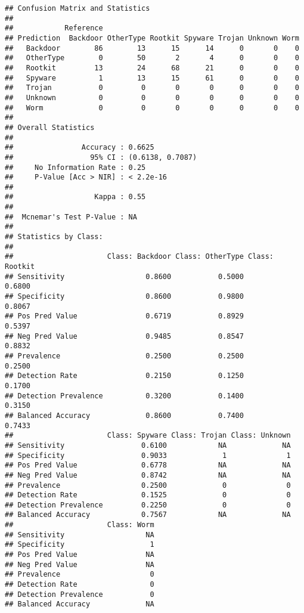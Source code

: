 \documentclass[]{article}
\begin{document}
\begin{verbatim}
## Confusion Matrix and Statistics
## 
##            Reference
## Prediction  Backdoor OtherType Rootkit Spyware Trojan Unknown Worm
##   Backdoor        86        13      15      14      0       0    0
##   OtherType        0        50       2       4      0       0    0
##   Rootkit         13        24      68      21      0       0    0
##   Spyware          1        13      15      61      0       0    0
##   Trojan           0         0       0       0      0       0    0
##   Unknown          0         0       0       0      0       0    0
##   Worm             0         0       0       0      0       0    0
## 
## Overall Statistics
##                                           
##                Accuracy : 0.6625          
##                  95% CI : (0.6138, 0.7087)
##     No Information Rate : 0.25            
##     P-Value [Acc > NIR] : < 2.2e-16       
##                                           
##                   Kappa : 0.55            
##                                           
##  Mcnemar's Test P-Value : NA              
## 
## Statistics by Class:
## 
##                      Class: Backdoor Class: OtherType Class: Rootkit
## Sensitivity                   0.8600           0.5000         0.6800
## Specificity                   0.8600           0.9800         0.8067
## Pos Pred Value                0.6719           0.8929         0.5397
## Neg Pred Value                0.9485           0.8547         0.8832
## Prevalence                    0.2500           0.2500         0.2500
## Detection Rate                0.2150           0.1250         0.1700
## Detection Prevalence          0.3200           0.1400         0.3150
## Balanced Accuracy             0.8600           0.7400         0.7433
##                      Class: Spyware Class: Trojan Class: Unknown
## Sensitivity                  0.6100            NA             NA
## Specificity                  0.9033             1              1
## Pos Pred Value               0.6778            NA             NA
## Neg Pred Value               0.8742            NA             NA
## Prevalence                   0.2500             0              0
## Detection Rate               0.1525             0              0
## Detection Prevalence         0.2250             0              0
## Balanced Accuracy            0.7567            NA             NA
##                      Class: Worm
## Sensitivity                   NA
## Specificity                    1
## Pos Pred Value                NA
## Neg Pred Value                NA
## Prevalence                     0
## Detection Rate                 0
## Detection Prevalence           0
## Balanced Accuracy             NA
\end{verbatim}
\end{document}
